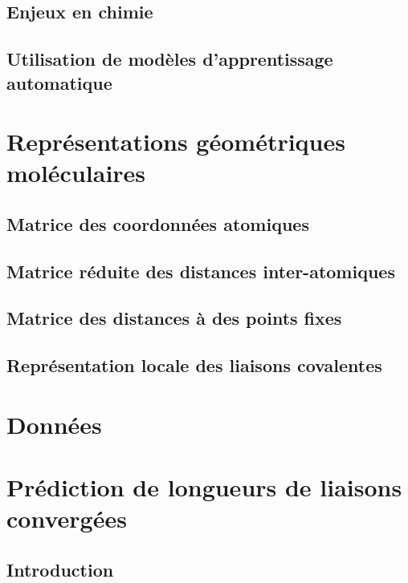 \documentclass{report}
\begin{document}
	\section{Enjeux en chimie}
		
	\section{Utilisation de modèles d'apprentissage automatique}
		
		
\chapter{Représentations géométriques moléculaires}
	\section{Matrice des coordonnées atomiques}
		

	\section{Matrice réduite des distances inter-atomiques}
		
		
	\section{Matrice des distances à des points fixes}
		
		
	\section{Représentation locale des liaisons covalentes}
		

\chapter{Données}

\chapter{Prédiction de longueurs de liaisons convergées}
	\section{Introduction}
		
\end{document}

